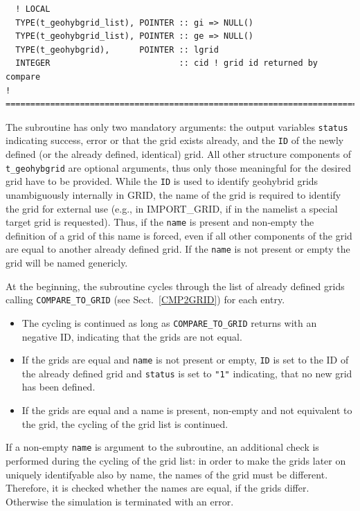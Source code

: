 \documentclass[11pt,twoside]{article}
\begin{document}
\begin{verbatim}
  ! LOCAL
  TYPE(t_geohybgrid_list), POINTER :: gi => NULL()
  TYPE(t_geohybgrid_list), POINTER :: ge => NULL()
  TYPE(t_geohybgrid),      POINTER :: lgrid
  INTEGER                          :: cid ! grid id returned by compare
! ==================================================================================
\end{verbatim}

The subroutine has only two mandatory arguments: the output variables
\verb|status| indicating success, error or that the grid exists already,
and the \verb|ID| of the newly defined (or the already defined,
identical) grid.
All other structure components of \verb|t_geohybgrid| are optional
arguments, thus only those meaningful for the desired grid have to be 
provided. While the \verb|ID| is used to identify geohybrid grids
unambiguously internally in GRID, the name of the grid is required to
identify the grid for external use (e.g., in IMPORT\_GRID, if in the
namelist a special target grid is requested). Thus, if the \verb|name|
is present and non-empty the definition
of a grid of this name is forced, even if all other components of the
grid are equal to another already defined grid. If the \verb|name| is
not present or empty the grid will be named genericly.

At the beginning, the subroutine cycles through the list of already defined 
grids calling \verb|COMPARE_TO_GRID| (see Sect.~\ref{CMP2GRID}) 
for each entry.
\begin{itemize}
\item The cycling is continued as long as \verb|COMPARE_TO_GRID|
returns with an negative ID, indicating that the grids are not equal.
\item If the grids are equal and \verb|name| is not present or
empty, \verb|ID| is set to the ID of the already defined 
grid and \verb|status| is set to \verb|"1"| indicating, that no new grid
has been defined. 
\item If the grids are equal and a name is present, non-empty and not
equivalent to the grid, the cycling of the grid list is continued. 
\end{itemize}

If a non-empty \verb|name| is argument to the subroutine, 
an additional check is performed during the cycling of the grid list:
in order to make the grids later on uniquely identifyable also by
name, the names of the grid must be different. Therefore,
it is checked whether the names are equal, if the grids differ.
Otherwise the simulation is terminated with an error.
\end{document}

